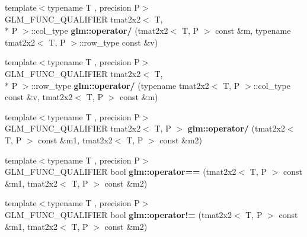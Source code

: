 \begin{DoxyCompactItemize}
\item 
\hypertarget{namespaceglm_a41ca2c01300738deb25fbc9a9e630cd4}{{\footnotesize template$<$typename T , precision P$>$ }\\G\-L\-M\-\_\-\-F\-U\-N\-C\-\_\-\-Q\-U\-A\-L\-I\-F\-I\-E\-R tmat2x2$<$ T, \\*
P $>$\-::col\-\_\-type {\bfseries glm\-::operator/} (tmat2x2$<$ T, P $>$ const \&m, typename tmat2x2$<$ T, P $>$\-::row\-\_\-type const \&v)}\label{namespaceglm_a41ca2c01300738deb25fbc9a9e630cd4}

\item 
\hypertarget{namespaceglm_a48dab5d24cd57eed83bce16c3e44a206}{{\footnotesize template$<$typename T , precision P$>$ }\\G\-L\-M\-\_\-\-F\-U\-N\-C\-\_\-\-Q\-U\-A\-L\-I\-F\-I\-E\-R tmat2x2$<$ T, \\*
P $>$\-::row\-\_\-type {\bfseries glm\-::operator/} (typename tmat2x2$<$ T, P $>$\-::col\-\_\-type const \&v, tmat2x2$<$ T, P $>$ const \&m)}\label{namespaceglm_a48dab5d24cd57eed83bce16c3e44a206}

\item 
\hypertarget{namespaceglm_a94743dfdf0d7c17b17f87e7253583853}{{\footnotesize template$<$typename T , precision P$>$ }\\G\-L\-M\-\_\-\-F\-U\-N\-C\-\_\-\-Q\-U\-A\-L\-I\-F\-I\-E\-R tmat2x2$<$ T, P $>$ {\bfseries glm\-::operator/} (tmat2x2$<$ T, P $>$ const \&m1, tmat2x2$<$ T, P $>$ const \&m2)}\label{namespaceglm_a94743dfdf0d7c17b17f87e7253583853}

\item 
\hypertarget{namespaceglm_adedfd20e640bc56d8a720e541e958ca2}{{\footnotesize template$<$typename T , precision P$>$ }\\G\-L\-M\-\_\-\-F\-U\-N\-C\-\_\-\-Q\-U\-A\-L\-I\-F\-I\-E\-R bool {\bfseries glm\-::operator==} (tmat2x2$<$ T, P $>$ const \&m1, tmat2x2$<$ T, P $>$ const \&m2)}\label{namespaceglm_adedfd20e640bc56d8a720e541e958ca2}

\item 
\hypertarget{namespaceglm_aa7932b253b4552536b3e7e9b6853a937}{{\footnotesize template$<$typename T , precision P$>$ }\\G\-L\-M\-\_\-\-F\-U\-N\-C\-\_\-\-Q\-U\-A\-L\-I\-F\-I\-E\-R bool {\bfseries glm\-::operator!=} (tmat2x2$<$ T, P $>$ const \&m1, tmat2x2$<$ T, P $>$ const \&m2)}\label{namespaceglm_aa7932b253b4552536b3e7e9b6853a937}

\end{DoxyCompactItemize}


